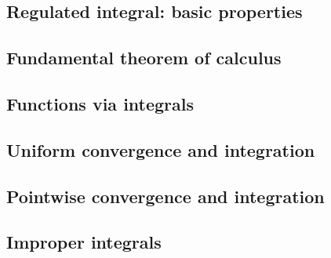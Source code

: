 \documentclass[10pt, a4paper]{article}
\begin{document}
\subsection{Regulated integral: basic properties}

\subsection{Fundamental theorem of calculus}

\subsection{Functions via integrals}

\subsection{Uniform convergence and integration}

\subsection{Pointwise convergence and integration}

\subsection{Improper integrals}
\end{document}
